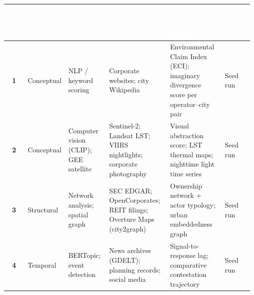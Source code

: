 
\bigskip
\begin{fullwidth}
\footnotesize
{}
\setlength{\tabcolsep}{4pt}
\renewcommand{\arraystretch}{1.2}
\begin{tabularx}{\linewidth}{%
  c
  >{\bfseries\raggedright}p{1.8cm}
  >{\raggedright}p{2.2cm}
  >{\raggedright}p{2.8cm}
  X
  >{\raggedright\arraybackslash}p{1.4cm}}
\toprule
\rowcolor{dcblue}
\textcolor{white}{\textbf{WP}} &
\textcolor{white}{\textbf{CAS dim.}} &
\textcolor{white}{\textbf{Method}} &
\textcolor{white}{\textbf{Data sources}} &
\textcolor{white}{\textbf{Key analytical output}} &
\textcolor{white}{\textbf{Status}} \\
\midrule
\textbf{1} & Conceptual &
  NLP / keyword scoring &
  Corporate websites; city Wikipedia &
  Environmental Claim Index (ECI); imaginary divergence score per operator--city pair &
  Seed run \\
\addlinespace[2pt]
\rowcolor{dcgray}
\textbf{2} & Conceptual &
  Computer vision (CLIP); GEE satellite &
  Sentinel-2; Landsat LST; VIIRS nightlights; corporate photography &
  Visual abstraction score; LST thermal maps; nighttime light time series &
  Seed run \\
\addlinespace[2pt]
\textbf{3} & Structural &
  Network analysis; spatial graph &
  SEC EDGAR; OpenCorporates; REIT filings; Overture Maps (city2graph) &
  Ownership network + actor typology; urban embeddedness graph &
  Seed run \\
\addlinespace[2pt]
\rowcolor{dcgray}
\textbf{4} & Temporal &
  BERTopic; event detection &
  News archives (GDELT); planning records; social media &
  Signal-to-response lag; comparative contestation trajectory &
  Seed run \\
\bottomrule
\end{tabularx}
\end{fullwidth}
\bigskip


